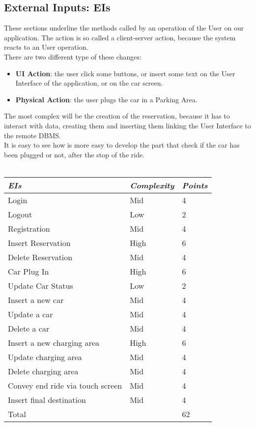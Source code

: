 \documentclass[11pt,a4paper]{report}
\begin{document}
\subsection{External Inputs: EIs}
These sections underline the methods called by an operation of the User on our application. The action is so called a client-server action, because the system reacts to an User operation.\\
There are two different type of these changes:
\begin{itemize}
	\item \textbf{UI Action}: the user click some buttons, or insert some text on the User Interface of the application, or on the car screen.
	\item \textbf{Physical Action}: the user plugs the car in a Parking Area.
\end{itemize}
The most complex will be the creation of the reservation, because it has to interact with data, creating them and inserting them linking the User Interface to the remote DBMS.\\It is easy to see how is more easy to develop the part that check if the car has been plugged or not, after the stop of the ride.\\\\
\begin{tabularx}{\textwidth}{|X|X|X|}
	\hline
	\textit{EIs} & \textit{Complexity} & \textit{Points}\\
	\hline
	Login & Mid & 4\\
	Logout & Low & 2 \\
	Registration & Mid & 4\\
	Insert Reservation & High & 6\\
	Delete Reservation & Mid & 4\\
	Car Plug In & High & 6\\
	Update Car Status & Low & 2\\
	Insert a new car & Mid & 4 \\
	Update a car & Mid & 4\\
	Delete a car & Mid & 4\\
	Insert a new charging area & High & 6\\
	Update charging area & Mid & 4\\
	Delete charging area & Mid & 4\\
	Convey end ride via touch screen & Mid & 4 \\ 
	Insert final destination & Mid & 4\\
	\hline
	\hline
	Total & \multicolumn{1}{X}{} & \multicolumn{1}{X|}{62}\\
	\hline
\end{tabularx}
\end{document}
